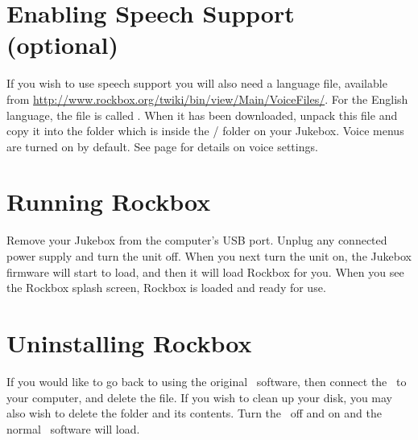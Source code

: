 \section{Enabling Speech Support (optional)}

If you wish to use speech support you will also need a language file,
available from
\url{http://www.rockbox.org/twiki/bin/view/Main/VoiceFiles/}.
 For the English language, the file is called .
When it has been downloaded, unpack this file and copy it into the
 folder which is inside the / folder on
your Jukebox. Voice menus are turned on by default.  See page
\pageref{ref:Voiceconfiguration} for details on voice settings.


\section{Running Rockbox}

Remove your Jukebox from the computer's USB port.
Unplug any connected power supply and turn the unit off. When you next
turn the unit on, the Jukebox firmware will start to load, and then it
will load Rockbox for you. When you see the Rockbox splash screen,
Rockbox is loaded and ready for use. 

\section{Uninstalling Rockbox}

If you would like to go back to using the original \playername\ software, then
connect the \playername\ to your computer, and delete the
 file.
If you wish to clean up your disk, you may also wish to delete the
 folder and its contents. Turn the \playername\ off and on and
the normal \playername\ software will load.
